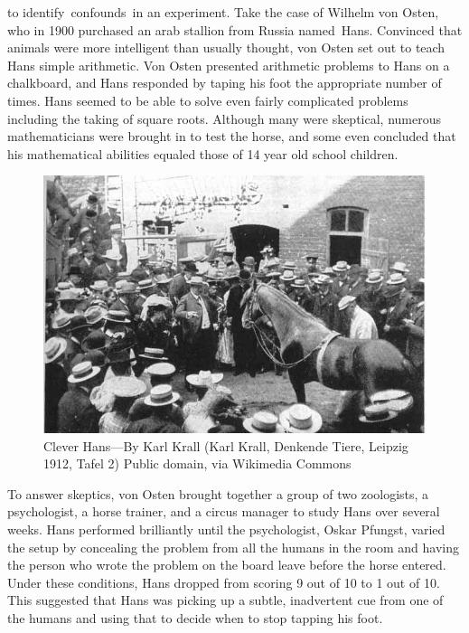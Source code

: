 \begin{refsection}
 to identify confounds in an experiment. Take the case of Wilhelm von Osten, who in 1900 purchased an arab stallion from Russia named Hans. Convinced that animals were more intelligent than usually thought, von Osten set out to teach Hans simple arithmetic. Von Osten presented arithmetic problems to Hans on a chalkboard, and Hans responded by taping his foot the appropriate number of times. Hans seemed to be able to solve even fairly complicated problems including the taking of square roots. Although many were skeptical, numerous mathematicians were brought in to test the horse, and some even concluded that his mathematical abilities equaled those of 14 year old school children.

\begin{figure}\includegraphics{../images/CleverHans.jpg}\caption{Clever Hans---By Karl Krall (Karl Krall, Denkende Tiere, Leipzig 1912, Tafel 2) Public domain, via Wikimedia Commons}\label{fig:cleverhans}\end{figure}

To answer skeptics, von Osten brought together a group of two zoologists, a psychologist, a horse trainer, and a circus manager to study Hans over several weeks. Hans performed brilliantly until the psychologist, Oskar Pfungst, varied the setup by concealing the problem from all the humans in the room and having the person who wrote the problem on the board leave before the horse entered. Under these conditions, Hans dropped from scoring 9 out of 10 to 1 out of 10. This suggested that Hans was picking up a subtle, inadvertent cue from one of the humans and using that to decide when to stop tapping his foot.


\end{refsection}
